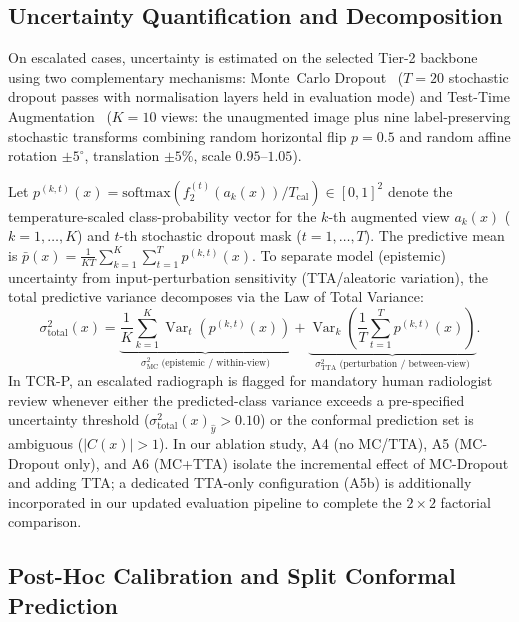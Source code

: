 \documentclass[diagnostics,article,submit,moreauthors]{Definitions/mdpi}
\newcommand{\rev}[1]{#1}
\begin{document}
\subsection{Uncertainty Quantification and Decomposition}

On escalated cases, uncertainty is estimated on the selected Tier-2 backbone using two complementary mechanisms: Monte~Carlo Dropout~\cite{gal2016dropout} ($T=20$ stochastic dropout passes with normalisation layers held in evaluation mode) and Test-Time Augmentation~\cite{wang2019aleatoric} ($K=10$ views: the unaugmented image plus nine label-preserving stochastic transforms combining random horizontal flip $p=0.5$ and random affine rotation $\pm 5^\circ$, translation $\pm 5\%$, scale $0.95$--$1.05$).

\rev{Let $p^{(k,t)}(x) = \mathrm{softmax}(f_2^{(t)}(a_k(x)) / T_{\text{cal}}) \in [0,1]^2$ denote the temperature-scaled class-probability vector for the $k$-th augmented view $a_k(x)$ ($k=1,\dots,K$) and $t$-th stochastic dropout mask ($t=1,\dots,T$). The predictive mean is $\bar{p}(x) = \frac{1}{KT}\sum_{k=1}^K\sum_{t=1}^T p^{(k,t)}(x)$. To separate model (epistemic) uncertainty from input-perturbation sensitivity (TTA/aleatoric variation), the total predictive variance decomposes via the Law of Total Variance:}
\begin{equation}
\rev{\sigma^2_{\text{total}}(x) = \underbrace{\frac{1}{K}\sum_{k=1}^{K}\operatorname{Var}_{t}\!\left(p^{(k,t)}(x)\right)}_{\sigma^2_{\text{MC}}\;\text{(epistemic / within-view)}} + \underbrace{\operatorname{Var}_{k}\!\left(\frac{1}{T}\sum_{t=1}^{T} p^{(k,t)}(x)\right)}_{\sigma^2_{\text{TTA}}\;\text{(perturbation / between-view)}}.}
\label{eq:var_decomp}
\end{equation}
\rev{In TCR-P, an escalated radiograph is flagged for mandatory human radiologist review whenever either the predicted-class variance exceeds a pre-specified uncertainty threshold ($\sigma^2_{\text{total}}(x)_{\hat{y}} > 0.10$) or the conformal prediction set is ambiguous ($|C(x)| > 1$). In our ablation study, A4 (no MC/TTA), A5 (MC-Dropout only), and A6 (MC+TTA) isolate the incremental effect of MC-Dropout and adding TTA; a dedicated TTA-only configuration (A5b) is additionally incorporated in our updated evaluation pipeline to complete the $2\times 2$ factorial comparison.}

\subsection{Post-Hoc Calibration and Split Conformal Prediction}
\end{document}
